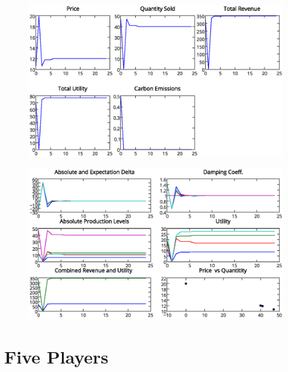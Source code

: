 \documentclass[12pt]{article}
\begin{document}
		\begin{figure}[ht!]
			\begin{center}
			\includegraphics[scale = .6]{4playertotals.eps}
			\end{center}
		\end{figure}


		\begin{figure}[ht!]
			\begin{center}
			\includegraphics[scale = .6]{4player.eps}
			\end{center}
		\end{figure}


\newpage

	\section{Five Players} \label{5Players}
\end{document}
